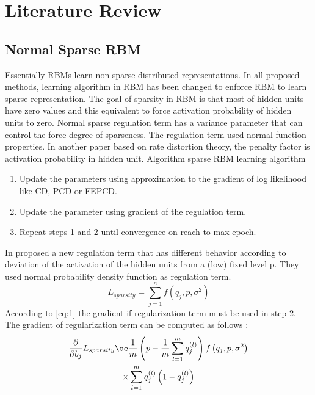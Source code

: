 \documentclass[conference]{IEEEtran}
\begin{document}
\section{Literature Review}
\subsection{Normal Sparse RBM}
Essentially
RBMs
learn
non-sparse
distributed
representations. In all proposed methods, learning algorithm in
RBM has been changed to enforce RBM to learn sparse
representation. The goal of sparsity in RBM is that most of
hidden units have zero values and this equivalent to force
activation probability of hidden units to zero. Normal sparse
regulation term has a variance parameter that can control the
force degree of sparseness. The regulation term used normal
function properties\cite{keyvanrad1}.
In another paper based on rate distortion theory, the
penalty factor is activation probability in hidden unit\cite{ji1}.
Algorithm sparse RBM learning algorithm\cite{lee1}
\begin{enumerate}
	\item Update the parameters using approximation to the
	gradient of log likelihood like CD, PCD or FEPCD.
	\item Update the parameter using gradient of the regulation
	term.
	\item Repeat steps 1 and 2 until convergence on reach to
	max epoch.
\end{enumerate}
In \cite{keyvanrad1} proposed a new regulation term that has different
behavior according to deviation of the activation of the hidden
units from a (low) fixed level p. They used normal probability
density function as regulation term.
\begin{equation}\label{eq:1}
L_{sparsity}=\sum_{j=1}^{n}f(q_{j},p,\sigma^{2})
\end{equation}
According to \ref{eq:1} the gradient if regularization
term must be used in step 2. The gradient of regularization
term can be computed as follows :
\begin{multline}
\frac{\partial}{\partial b_{j}}L_{sparsity }\oe  \frac{1}{m}\left ( p-\frac{1}{m}\sum_{l=1}^{m}q_{j}^{(l)} \right )f\left ( q_{j},p,\sigma^{2}   \right )\\ \times\sum_{l=1}^{m}q_{j}^{(l)}\left ( 1-q_{j}^{(l)} \right )
\end{multline}
\end{document}
